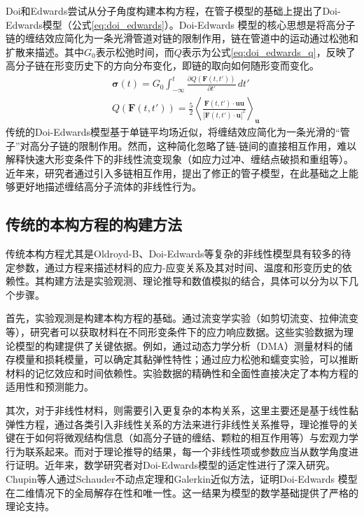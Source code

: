 Doi和Edwards尝试从分子角度构建本构方程，在管子模型的基础上提出了Doi-Edwards模型（公式\eqref{eq:doi_edwards}）。Doi-Edwards 模型的核心思想是将高分子链的缠结效应简化为一条光滑管道对链的限制作用，链在管道中的运动通过松弛和扩散来描述\cite{doi1978dynamics1,doi1978dynamics2,doi1978dynamics3,doi1979dynamics4}。其中$G_0$表示松弛时间，而$Q$表示为公式\eqref{eq:doi_edwards_q}，反映了高分子链在形变历史下的方向分布变化，即链的取向如何随形变而变化。
\begin{align}
   & \boldsymbol{\sigma}(t)  = G_0 \int_{-\infty}^t \frac{\partial Q(\mathbf{F}(t,t'))}{\partial t'} \, dt'    \label{eq:doi_edwards}                                                                  \\
   & Q(\mathbf{F}(t,t'))     = \frac{5}{2} \left\langle \frac{\mathbf{F}(t,t') \cdot \mathbf{u} \mathbf{u}}{|\mathbf{F}(t,t') \cdot \mathbf{u}|^2} \right\rangle_{\mathbf{u}} \label{eq:doi_edwards_q}
\end{align}
传统的Doi-Edwards模型基于单链平均场近似，将缠结效应简化为一条光滑的“管子”对高分子链的限制作用。然而，这种简化忽略了链-链间的直接相互作用，难以解释快速大形变条件下的非线性流变现象（如应力过冲、缠结点破损和重组等）。近年来，研究者通过引入多链相互作用，提出了修正的管子模型，在此基础之上能够更好地描述缠结高分子流体的非线性行为\cite{OConnor1992ConfirmationOT,hassager2010constitutive,chupin2017mathematical}。

\subsection{传统的本构方程的构建方法}
传统本构方程尤其是Oldroyd-B、Doi-Edwards等复杂的非线性模型具有较多的待定参数，通过方程来描述材料的应力-应变关系及其对时间、温度和形变历史的依赖性。其构建方法是实验观测、理论推导和数值模拟的结合，具体可以分为以下几个步骤。

首先，实验观测是构建本构方程的基础。通过流变学实验（如剪切流变、拉伸流变等），研究者可以获取材料在不同形变条件下的应力响应数据。这些实验数据为理论模型的构建提供了关键依据。例如，通过动态力学分析（DMA）测量材料的储存模量和损耗模量，可以确定其黏弹性特性；通过应力松弛和蠕变实验，可以推断材料的记忆效应和时间依赖性。实验数据的精确性和全面性直接决定了本构方程的适用性和预测能力\cite{alvesNumericalMethodsViscoelastic2021,stadlerWhatAreTypical2014}。

其次，对于非线性材料，则需要引入更复杂的本构关系，这里主要还是基于线性黏弹性方程，通过各类引入非线性关系的方法来进行非线性关系推导，理论推导的关键在于如何将微观结构信息（如高分子链的缠结、颗粒的相互作用等）与宏观力学行为联系起来。而对于理论推导的结果，每一个非线性项或参数应当从数学角度进行证明\cite{zhai2024global}。近年来，数学研究者对Doi-Edwards模型的适定性进行了深入研究。Chupin等人通过Schauder不动点定理和Galerkin近似方法，证明Doi-Edwards 模型在二维情况下的全局解存在性和唯一性\cite{hassager2010constitutive}。这一结果为模型的数学基础提供了严格的理论支持。

